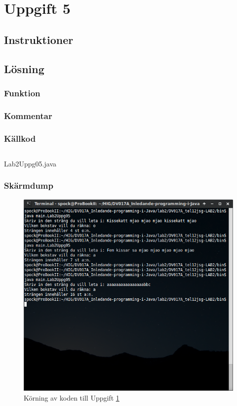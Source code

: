 \section{Uppgift 5}\label{sec:uppg05}

\subsection{Instruktioner}


\subsection{Lösning}
\subsubsection{Funktion}

\subsubsection{Kommentar}


\subsubsection{Källkod}
\inputminted[linenos]{java}{src/Lab2Uppg05.java}
\caption{Lab2Uppg05.java}
\label{src:uppg05}


\subsubsection{Skärmdump}
\begin{figure}[htbp]
    \centering
        \includegraphics[width=\linewidth]{img/05.png}
    \caption{Körning av koden till Uppgift \ref{sec:uppg05}}
    \label{fig:uppg05-screenshot}
\end{figure}

